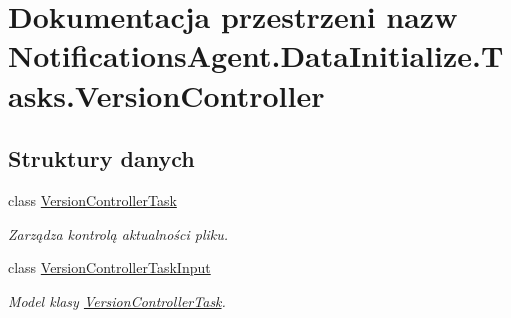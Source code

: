 \hypertarget{a00303}{}\section{Dokumentacja przestrzeni nazw Notifications\+Agent.\+Data\+Initialize.\+Tasks.\+Version\+Controller}
\label{a00303}
\subsection*{Struktury danych}
\begin{DoxyCompactItemize}
\item 
class \hyperlink{a00082}{Version\+Controller\+Task}
\begin{DoxyCompactList}\small\item\em Zarządza kontrolą aktualności pliku. \end{DoxyCompactList}\item 
class \hyperlink{a00083}{Version\+Controller\+Task\+Input}
\begin{DoxyCompactList}\small\item\em Model klasy \hyperlink{a00082}{Version\+Controller\+Task}. \end{DoxyCompactList}\end{DoxyCompactItemize}
